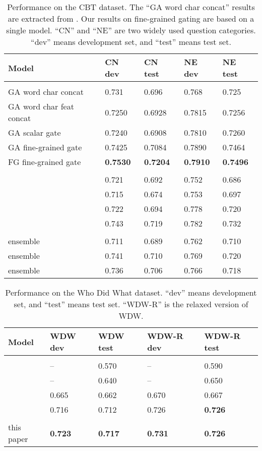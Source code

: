\documentclass{article} \usepackage{iclr2017_conference,times}
\begin{document}
\begin{table}[t]
\caption{\small Performance on the CBT dataset. The ``GA word char concat'' results are extracted from \cite{dhingra2016gated}. Our results on fine-grained gating are based on a single model. ``CN'' and ``NE'' are two widely used question categories. ``dev'' means development set, and ``test'' means test set.}
\label{tab:cbt}
\begin{center}
\begin{tabular}{lllll}
Model & CN dev & CN test & NE dev & NE test
\\ \hline \\
GA word char concat & 0.731 & 0.696 & 0.768 & 0.725 \\
GA word char feat concat & 0.7250 & 0.6928 & 0.7815 & 0.7256 \\
GA scalar gate & 0.7240 & 0.6908 & 0.7810 & 0.7260 \\
GA fine-grained gate & 0.7425 & 0.7084 & 0.7890 & 0.7464 \\
FG fine-grained gate & \textbf{0.7530} & \textbf{0.7204} & \textbf{0.7910} & \textbf{0.7496} \\
\hline \\
\cite{sordoni2016iterative} & 0.721 & 0.692 & 0.752 & 0.686 \\
\cite{trischler2016natural} & 0.715 & 0.674 & 0.753 & 0.697 \\
\cite{cui2016attention} & 0.722 & 0.694 & 0.778 & 0.720 \\
\cite{munkhdalai2016neural} & 0.743 & 0.719 & 0.782 & 0.732 \\
\hline \\
\cite{kadlec2016text} ensemble & 0.711 & 0.689 & 0.762 & 0.710 \\
\cite{sordoni2016iterative} ensemble & 0.741 & 0.710 & 0.769 & 0.720 \\
\cite{trischler2016natural} ensemble & 0.736 & 0.706 & 0.766 & 0.718
\end{tabular}
\end{center}
\end{table}

\begin{table}[t]
\caption{\small Performance on the Who Did What dataset. ``dev'' means development set, and ``test'' means test set. ``WDW-R'' is the relaxed version of WDW.}
\label{tab:wdw}
\begin{center}
\begin{tabular}{lllll}
Model & WDW dev & WDW test & WDW-R dev & WDW-R test
\\ \hline \\
\cite{kadlec2016text} & -- & 0.570 & -- & 0.590 \\
\cite{chen2016thorough} & -- & 0.640 & -- & 0.650  \\
\cite{munkhdalai2016neural} & 0.665 & 0.662 & 0.670 & 0.667 \\
\cite{dhingra2016gated} & 0.716 & 0.712 & 0.726 & \textbf{0.726} \\
\hline \\
this paper & \textbf{0.723} & \textbf{0.717} & \textbf{0.731} & \textbf{0.726}
\end{tabular}
\end{center}
\end{table}
\end{document}
